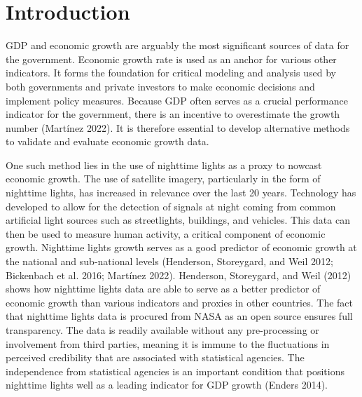 \documentclass[
  manuscript=article,
  layout=publish,
  year=2026,
  volume=3,
]{den}
\begin{document}
\section{Introduction}\label{introduction}

GDP and economic growth are arguably the most significant sources of
data for the government. Economic growth rate is used as an anchor for
various other indicators. It forms the foundation for critical modeling
and analysis used by both governments and private investors to make
economic decisions and implement policy measures. Because GDP often
serves as a crucial performance indicator for the government, there is
an incentive to overestimate the growth number (Martínez 2022). It is
therefore essential to develop alternative methods to validate and
evaluate economic growth data.

One such method lies in the use of nighttime lights as a proxy to
nowcast economic growth. The use of satellite imagery, particularly in
the form of nighttime lights, has increased in relevance over the last
20 years. Technology has developed to allow for the detection of signals
at night coming from common artificial light sources such as
streetlights, buildings, and vehicles. This data can then be used to
measure human activity, a critical component of economic growth.
Nighttime lights growth serves as a good predictor of economic growth at
the national and sub-national levels (Henderson, Storeygard, and Weil
2012; Bickenbach et al. 2016; Martínez 2022). Henderson, Storeygard, and
Weil (2012) shows how nighttime lights data are able to serve as a
better predictor of economic growth than various indicators and proxies
in other countries. The fact that nighttime lights data is procured from
NASA as an open source ensures full transparency. The data is readily
available without any pre-processing or involvement from third parties,
meaning it is immune to the fluctuations in perceived credibility that
are associated with statistical agencies. The independence from
statistical agencies is an important condition that positions nighttime
lights well as a leading indicator for GDP growth (Enders 2014).
\end{document}
